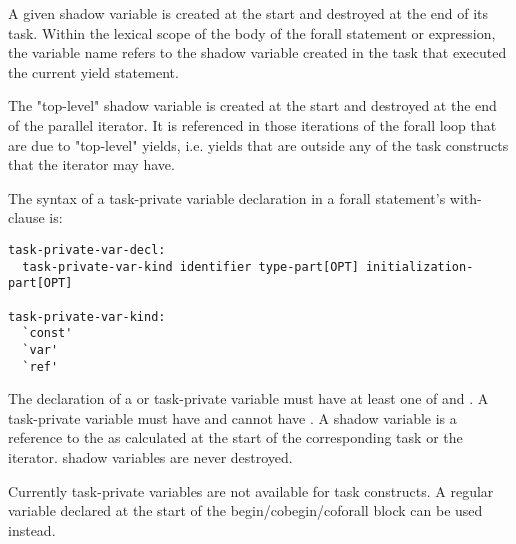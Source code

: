 A given shadow variable is created at the start and destroyed
at the end of its task.
Within the lexical scope of the body of the forall statement or expression,
the variable name refers to the shadow variable created in the task
that executed the current yield statement.

The "top-level" shadow variable is created at the start and destroyed
at the end of the parallel iterator. It is referenced in those iterations
of the forall loop that are due to "top-level" yields, i.e. yields
that are outside any of the task constructs that the iterator may have.

The syntax of a task-private variable declaration in a forall statement's
with-clause is:

\begin{syntax}
\begin{verbatim}
task-private-var-decl:
  task-private-var-kind identifier type-part[OPT] initialization-part[OPT]

task-private-var-kind:
  `const'
  `var'
  `ref'
\end{verbatim}
\end{syntax}

The declaration of a  or  task-private variable must
have at least one of  and .
A  task-private variable must have 
and cannot have . A  shadow variable
is a reference to the  as calculated at
the start of the corresponding task or the iterator.
 shadow variables are never destroyed.

\begin{craychapel}
Currently task-private variables are not available for task constructs.
A regular variable declared at the start of the begin/cobegin/coforall
block can be used instead.
\end{craychapel}

